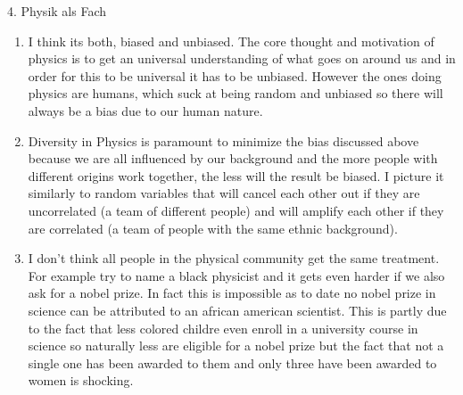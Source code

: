 \documentclass{alex_hü}
\begin{document}
\begin{mybox}{4. Physik als Fach}
	\begin{enumerate}
		\item I think its both, biased and unbiased. The core thought and motivation of physics is to get an universal understanding of what goes on around us and in order for this to be universal it has to be unbiased. However the ones doing physics are humans, which suck at being random and unbiased so there will always be a bias due to our human nature. 
	\tcbline
		\item Diversity in Physics is paramount to minimize the bias discussed above because we are all influenced by our background and the more people with different origins work together, the less will the result be biased. I picture it similarly to random variables that will cancel each other out if they are uncorrelated (a team of different people) and will amplify each other if they are correlated (a team of people with the same ethnic background).
	\tcbline
		\item I don't think all people in the physical community get the same treatment. For example try to name a black physicist and it gets even harder if we also ask for a nobel prize. In fact this is impossible as to date no nobel prize in science can be attributed to an african american scientist. This is partly due to the fact that less colored childre even enroll in a university course in science so naturally less are eligible for a nobel prize but the fact that not a single one has been awarded to them and only three have been awarded to women is shocking. 
	\end{enumerate}
\end{mybox}
\end{document}
